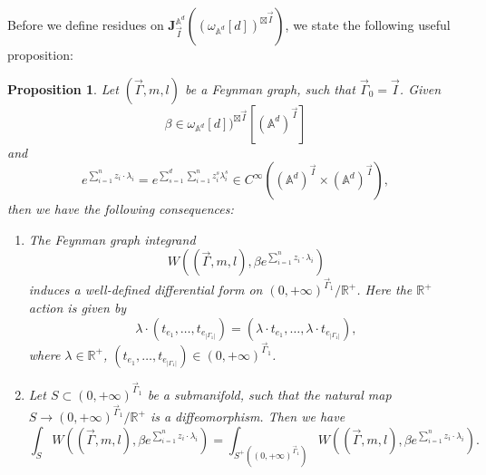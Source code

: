 \documentclass[11pt]{amsart}
\newtheorem{prop}[thm]{Proposition}
\theoremstyle{definition}
\theoremstyle{remark}
\numberwithin{equation}{section}
\begin{document}
Before we define residues on $\mathbf{J}_{\vec{I}}^{\mathbb{A}^{d}}((\omega_{\mathbb{A}^{d}}[d])^{\boxtimes\vec{I}})$, we state the following useful proposition:
\begin{prop}\label{useful property}
    Let $(\vec{\Gamma},m,l)$ be a Feynman graph, such that $\vec{\Gamma}_{0}=\vec{I}$. Given 
    $$
    \beta\in \omega_{\mathbb{A}^{d}}[d])^{\boxtimes\vec{I}}[(\mathbb{A}^{d})^{\vec{I}}]
    $$
    and
    $$
    e^{\sum_{i=1}^{n}z_{i}\cdot\lambda_{i}}=e^{\sum_{s=1}^{d}\sum_{i=1}^{n}z^{s}_{i}\lambda^{s}_{i}}\in C^{\infty}((\mathbb{A}^{d})^{\vec{I}}\times (\mathbb{A}^{d})^{\vec{I}}),
    $$
    then we have the following consequences:
    \begin{enumerate}
        \item The Feynman graph integrand
        $$
        W((\vec{\Gamma},m,l),\beta e^{\sum_{i=1}^{n}z_{i}\cdot\lambda_{i}})
        $$
        induces a well-defined differential form on $(0,+\infty)^{\vec{\Gamma}_{1}}/\mathbb{R}^{+}$. Here the $\mathbb{R}^{+}$ action is given by
        $$
        \lambda\cdot(t_{e_{1}},\dots,t_{e_{|\Gamma_{1}|}})=(\lambda\cdot t_{e_{1}},\dots,\lambda\cdot t_{e_{|\Gamma_{1}|}}),
        $$
        where $\lambda\in \mathbb{R}^{+}$, $(t_{e_{1}},\dots,t_{e_{|\Gamma_{1}|}})\in (0,+\infty)^{\vec{\Gamma}_{1}}$.
        \item Let $S\subset(0,+\infty)^{\vec{\Gamma}_{1}}$ be a submanifold, such that the natural map $S\rightarrow(0,+\infty)^{\vec{\Gamma}_{1}}/\mathbb{R}^{+}$ is a diffeomorphism. Then we have
        $$
        \int_{S}W((\vec{\Gamma},m,l),\beta e^{\sum_{i=1}^{n}z_{i}\cdot\lambda_{i}})=
        \int_{S^{+}((0,+\infty)^{\vec{\Gamma}_{1}})}W((\vec{\Gamma},m,l),\beta e^{\sum_{i=1}^{n}z_{i}\cdot\lambda_{i}}).
        $$
    \end{enumerate}
\end{prop}
\end{document}
